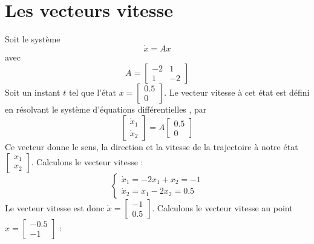    \section{Les vecteurs vitesse}
        Soit le système
        \begin{equation}
            \dot{x} = A x
        \end{equation}
        avec 
        \begin{equation}
            A = \begin{bmatrix} -2 & 1 \\ 1 & -2 \end{bmatrix}
        \end{equation}
        Soit un instant $t$ tel que l'état $x = \begin{bmatrix} 0.5 \\ 0 \end{bmatrix}$. Le vecteur vitesse à cet état est défini en résolvant le système d'équations différentielles , par
        \begin{equation}
            \begin{bmatrix} \dot{x}_1 \\ \dot{x}_2 \end{bmatrix} = A \begin{bmatrix} 0.5 \\ 0 \end{bmatrix}
        \end{equation}
        Ce vecteur donne le sens, la direction et la vitesse de la trajectoire à notre état $\begin{bmatrix}x_1\\ x_2\end{bmatrix}$. Calculons le vecteur vitesse :
        \begin{equation}
            \begin{cases}
                \dot{x}_1 = -2x_1 + x_2 = -1\\
                \dot{x}_2 = x_1 - 2x_2 = 0.5
            \end{cases}
        \end{equation}
        Le vecteur vitesse est donc $\dot{x} = \begin{bmatrix} -1\\ 0.5\end{bmatrix} $.
        Calculons le vecteur vitesse au point $x = \begin{bmatrix} -0.5 \\ -1 \end{bmatrix}$ :
